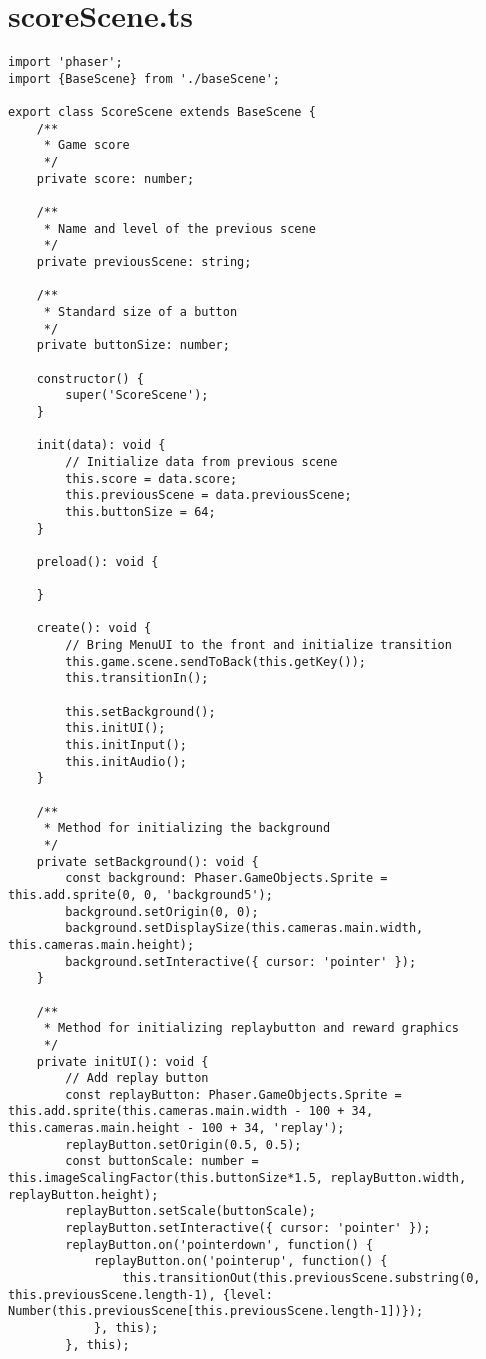 \section{scoreScene.ts}\label{sec:scorescene.ts}
\begin{lstlisting}[style=TypeScript, caption={scoreScene.ts}]
import 'phaser';
import {BaseScene} from './baseScene';

export class ScoreScene extends BaseScene {
    /**
     * Game score
     */
    private score: number;

    /**
     * Name and level of the previous scene
     */
    private previousScene: string;

    /**
     * Standard size of a button
     */
    private buttonSize: number;

    constructor() {
        super('ScoreScene');
    }

    init(data): void {
        // Initialize data from previous scene
        this.score = data.score;
        this.previousScene = data.previousScene;
        this.buttonSize = 64;
    }

    preload(): void {

    }

    create(): void {
        // Bring MenuUI to the front and initialize transition
        this.game.scene.sendToBack(this.getKey());
        this.transitionIn();

        this.setBackground();
        this.initUI();
        this.initInput();
        this.initAudio();
    }

    /**
     * Method for initializing the background
     */
    private setBackground(): void {
        const background: Phaser.GameObjects.Sprite = this.add.sprite(0, 0, 'background5');
        background.setOrigin(0, 0);
        background.setDisplaySize(this.cameras.main.width, this.cameras.main.height);
        background.setInteractive({ cursor: 'pointer' });
    }

    /**
     * Method for initializing replaybutton and reward graphics
     */
    private initUI(): void {
        // Add replay button
        const replayButton: Phaser.GameObjects.Sprite = this.add.sprite(this.cameras.main.width - 100 + 34, this.cameras.main.height - 100 + 34, 'replay');
        replayButton.setOrigin(0.5, 0.5);
        const buttonScale: number = this.imageScalingFactor(this.buttonSize*1.5, replayButton.width, replayButton.height);
        replayButton.setScale(buttonScale);
        replayButton.setInteractive({ cursor: 'pointer' });
        replayButton.on('pointerdown', function() {
            replayButton.on('pointerup', function() {
                this.transitionOut(this.previousScene.substring(0, this.previousScene.length-1), {level: Number(this.previousScene[this.previousScene.length-1])});
            }, this);
        }, this);


\end{lstlisting}
